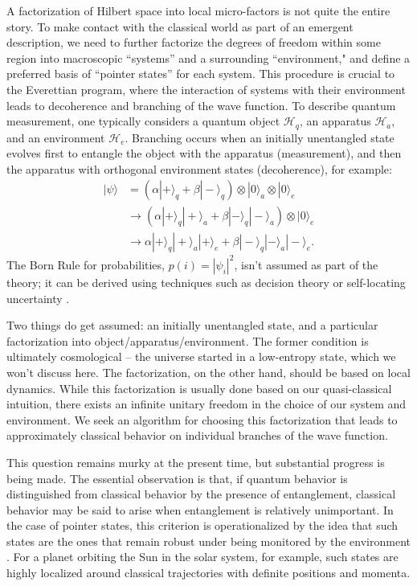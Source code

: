 \documentclass[12pt,english]{article}
\newcommand{\HH}{\mathcal{H}}
\begin{document}
A factorization of Hilbert space into local micro-factors is not quite the entire story.
To make contact with the classical world as part of an emergent description, we need to further factorize the degrees of freedom within some region into macroscopic ``systems'' and a surrounding ``environment," and define a preferred basis of ``pointer states'' for each system. 
This procedure is crucial to the Everettian program, where the interaction of systems with their environment leads to decoherence and branching of the wave function.
To describe quantum measurement, one typically considers a quantum object $\HH_q$, an apparatus $\HH_a$, and an environment $\HH_e$.
Branching occurs when an initially unentangled state evolves first to entangle the object with the apparatus (measurement), and then the apparatus with orthogonal environment states (decoherence), for example:
\begin{align}
  |\psi\rangle &= (\alpha|+\rangle_q + \beta|-\rangle_q)\otimes |0\rangle_a \otimes |0\rangle_e \\
  & \rightarrow (\alpha|+\rangle_q|+\rangle_a + \beta|-\rangle_q|-\rangle_a) \otimes |0\rangle_e \\
  & \rightarrow \alpha|+\rangle_q|+\rangle_a|+\rangle_e + \beta|-\rangle_q|-\rangle_a|-\rangle_e .
\end{align}
The Born Rule for probabilities, $p(i) = |\psi_i|^2$, isn't assumed as part of the theory; it can be derived using techniques such as decision theory\cite{2009arXiv0906.2718W} or self-locating uncertainty \cite{Sebens:2014iwa}.

Two things do get assumed: an initially unentangled state, and a particular factorization into object/apparatus/environment.
The former condition is ultimately cosmological -- the universe started in a low-entropy state, which we won't discuss here.
The factorization, on the other hand, should be based on local dynamics.
While this factorization is usually done based on our quasi-classical intuition, there exists an infinite unitary freedom in the choice of our system and environment. 
We seek an algorithm for choosing this factorization that leads to approximately classical behavior on individual branches of the wave function.

This question remains murky at the present time, but substantial progress is being made.
The essential observation is that, if quantum behavior is distinguished from classical behavior by the presence of entanglement, classical behavior may be said to arise when entanglement is relatively unimportant.
In the case of pointer states, this criterion is operationalized by the idea that such states are the ones that remain robust under being monitored by the environment \cite{Zurek:1981xq}.
For a planet orbiting the Sun in the solar system, for example, such states are highly localized around classical trajectories with definite positions and momenta.
\end{document}
